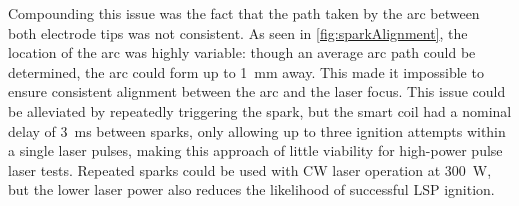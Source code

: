         Compounding this issue was the fact that the path taken by the arc between both electrode tips was not consistent. As seen in \autoref{fig:sparkAlignment}, the location of the arc was highly variable: though an average arc path could be determined, the arc could form up to \qty{1}{mm} away. This made it impossible to ensure consistent alignment between the arc and the laser focus. This issue could be alleviated by repeatedly triggering the spark, but the smart coil had a nominal delay of \qty{3}{ms} between sparks, only allowing up to three ignition attempts within a single laser pulses, making this approach of little viability for high-power pulse laser tests. Repeated sparks could be used with CW laser operation at \qty{300}{W}, but the lower laser power also reduces the likelihood of successful LSP ignition.

